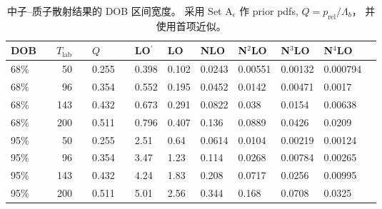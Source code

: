 
\begin{table}
  \caption{中子--质子散射结果的 DOB 区间宽度。
    采用 Set A$_{\epsilon}$ 作 prior pdfs,
    $Q=p_{\textrm{rel}}/\Lambda_b$，
    并使用首项近似。\label{tab:tab8}}
  \centering
  \begin{tabular}{llrrll*{7}{l}}
    \toprule\hline
    DOB &\quad & $T_{\textrm{lab}}$ & \quad & $Q$ & \quad &
    LO$^\prime$ & LO &  NLO & N${}^2$LO & N${}^3$LO & N${}^4$LO \\
    \hline
    
    68\% && 50 && 0.255 &&
0.398  & 0.102 &  0.0243 & 0.00551 &   0.00132 &   0.000794  
    \\

    68\% && 96 && 0.354 &&
0.552 & 0.195 &  0.0452 & 0.0142 &    0.00471    & 0.0017    
    \\

    68\% && 143 && 0.432 &&
0.673 & 0.291 &  0.0822  &0.038 &     0.0154 &    0.00638   
    \\

    68\% && 200 && 0.511 &&
0.796 & 0.407 &  0.136 &  0.0889 &    0.0426 &    0.0209    
    \\

    \hline

    95\% && 50 && 0.255 &&
2.51 &  0.64 &   0.0614 & 0.0104 &    0.00219 &   0.00124   
    \\

    95\% && 96 && 0.354 &&
3.47 &  1.23 &   0.114 &  0.0268 &    0.00784 &   0.00265   
    \\

    95\% && 143 && 0.432 &&
4.24 &  1.83 &   0.208 &  0.0717 &    0.0256 &    0.00995   
    \\

    95\% && 200 && 0.511 &&
5.01 &  2.56 &   0.344 &  0.168 &     0.0708     & 0.0325    
    \\
    \hline\bottomrule
  \end{tabular}
  
\end{table}
